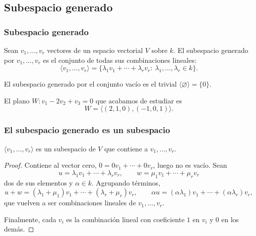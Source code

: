 \subsection{Subespacio generado}

\begin{frame}
    \frametitle{Subespacio generado}

    \begin{definition}
        Sean $v_1,\ldots,v_r$ vectores de un espacio vectorial $V$ sobre $k$.
        El \alert{subespacio generado} por $v_1,\ldots,v_r$ es el conjunto
        de todas sus combinaciones lineales:
        \[
            \langle v_1,\ldots,v_r\rangle
            =\{\lambda_1v_1+\cdots+\lambda_rv_r:\ \lambda_1,\ldots,\lambda_r\in k\}.
        \]
    \end{definition}

    \medskip

    El subespacio generado por el conjunto vacío es el trivial
    $\langle\varnothing\rangle=\{0\}$.

    \medskip

    El plano $W\colon v_1-2v_2+v_3=0$
    que acabamos de estudiar es
    \[
        W=\langle(2,1,0),(-1,0,1)\rangle.
    \]
\end{frame}

\begin{frame}
    \frametitle{El subespacio generado es un subespacio}

    \begin{proposition}
        $\langle v_1,\ldots,v_r\rangle$ es un subespacio de $V$ que contiene
        a $v_1,\ldots,v_r$.
    \end{proposition}

    \begin{proof}
        Contiene al vector cero, $0=0v_1+\cdots+0v_r$, luego no es vacío.
        Sean
        \[
            u=\lambda_1v_1+\cdots+\lambda_rv_r,
            \qquad
            w=\mu_1v_1+\cdots+\mu_rv_r
        \]
        dos de sus elementos y $\alpha\in k$. Agrupando términos,
        \[
            u+w=(\lambda_1+\mu_1)v_1+\cdots+(\lambda_r+\mu_r)v_r,
            \qquad
            \alpha u=(\alpha\lambda_1)v_1+\cdots+(\alpha\lambda_r)v_r,
        \]
        que vuelven a ser combinaciones lineales de $v_1,\ldots,v_r$.

        Finalmente, cada $v_i$ es la combinación lineal con coeficiente $1$
        en $v_i$ y $0$ en los demás.
    \end{proof}
\end{frame}

